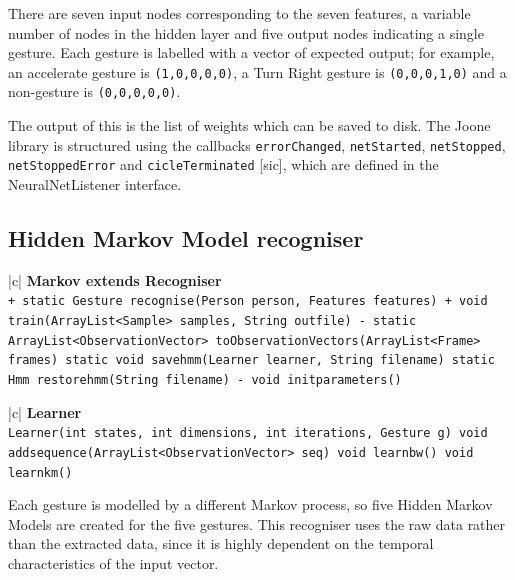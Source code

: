 \documentclass[12pt,a4,notitlepage]{report}
\renewcommand{\_}{\texttt{\symbol{95}}}
\newcommand{\<}{\texttt{\symbol{60}}}
\renewcommand{\>}{\texttt{\symbol{62}}}
\newcommand{\class}[1]{\textbf{#1}}
\newcommand{\variable}[1]{\texttt{#1}}
\begin{document}
There are seven input nodes corresponding to the seven features, a variable number of nodes in the hidden layer and five output nodes indicating a single gesture. Each gesture is labelled with a vector of expected output; for example, an accelerate gesture is \variable{(1,0,0,0,0)}, a Turn Right gesture is \variable{(0,0,0,1,0)} and a non-gesture is \variable{(0,0,0,0,0)}.

The output of this is the list of weights which can be saved to disk. The Joone library is structured using the callbacks \variable{errorChanged}, \variable{netStarted}, \variable{netStopped}, \variable{netStoppedError} and \variable{cicleTerminated} [sic], which are defined in the NeuralNetListener interface.

\newpage

\subsection{Hidden Markov Model recogniser}

\begin{tabular}{|c|} \hline 
\class{Markov extends Recogniser} \\ \hline
{}
{ \variable{+ static Gesture recognise(Person person, Features features) \newline
+ void train(ArrayList<Sample> samples, String out\_file) \newline
- static ArrayList<ObservationVector> toObservationVectors(ArrayList<Frame> frames) \newline
static void save\_hmm(Learner learner, String filename) \newline
static Hmm restore\_hmm(String filename) \newline
- void init\_parameters()
} } \\ \hline
\end{tabular}

\begin{tabular}{|c|} \hline 
\class{Learner} \\ \hline
{}
{ \variable{Learner(int states, int dimensions, int iterations, Gesture g) \newline
void add\_sequence(ArrayList<ObservationVector> seq) \newline
void learnbw() \newline
void learnkm()
} } \\ \hline
\end{tabular}

Each gesture is modelled by a different Markov process, so five Hidden Markov Models are created for the five gestures. This recogniser uses the raw data rather than the extracted data, since it is highly dependent on the temporal characteristics of the input vector.
\end{document}
